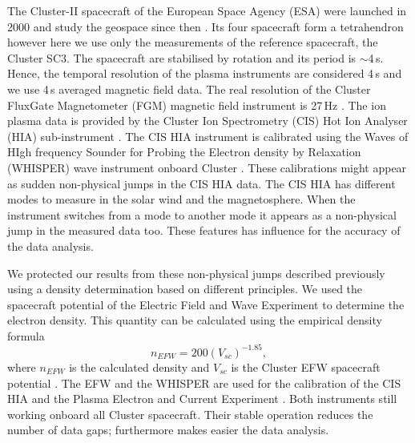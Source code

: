 \documentclass[linenumbers,draft]{agujournal}
\begin{document}
The Cluster-II spacecraft of the European Space Agency (ESA) were launched in 2000 and study the geospace since then \citep{credland97:_clust_mission,escoubet01:_introd_clust}. Its four spacecraft form a tetrahendron however here we use only the measurements of the reference spacecraft, the Cluster SC3. The spacecraft are stabilised by rotation and its period is $\sim$4\,s. Hence, the temporal resolution of the plasma instruments are considered 4\,s and we use 4\,s averaged magnetic field data. The real resolution of the Cluster FluxGate Magnetometer (FGM) magnetic field instrument is 27\,Hz \citep{balogh97:_clust_magnet_field_inves,balogh01:_clust_magnet_field_inves}. The ion plasma data is provided by the Cluster Ion Spectrometry (CIS) Hot Ion Analyser (HIA) sub-instrument \citep{reme97:_clust_ion_spect_exper,reme01:_first_earth_clust_cis}. The CIS HIA instrument is calibrated using the Waves of HIgh frequency Sounder for Probing the Electron density by Relaxation (WHISPER) wave instrument onboard Cluster \citep{decreau01:_early_whisp_clust,trotignon10:_whisp_relax_sound_clust_activ_archiv,blagau13:_in_hot_ion_analy_clust,blagau14:_in_hot_ion_analy_clust}. These calibrations might appear as sudden non-physical jumps in the CIS HIA data. The CIS HIA has different modes to measure in the solar wind and the magnetosphere. When the instrument switches from a mode to another mode it appears as a non-physical jump in the measured data too. These features has influence for the accuracy of the data analysis.

We protected our results from these non-physical jumps described previously using a density determination based on different principles. We used the spacecraft potential of the Electric Field and Wave Experiment \citep[EFW ;][]{gustafsson97:_elect_field_wave_exper_clust_mission,gustafsson01:_first_clust_efw} to determine the electron density. This quantity can be calculated using the empirical density formula 
\begin{equation}\label{eq:empdens}
n_{EFW}=200(V_{sc})^{-1.85},
\end{equation}
where $n_{EFW}$ is the calculated density and $V_{sc}$ is the Cluster EFW spacecraft potential \citep{trotignon10:_whisp_relax_sound_clust_activ_archiv,trotignon11:_calib_repor_whisp_measur_clust}. The EFW and the WHISPER are used for the calibration of the CIS HIA and the Plasma Electron and Current Experiment \citep[PEACE;][]{johnstone97:_peace,fazakerley10:_peace_data_clust_activ_archiv,fazakerley10:_clust_peace_in_calib_status}. Both instruments still working onboard all Cluster spacecraft. Their stable operation reduces the number of data gaps; furthermore makes easier the data analysis.
\end{document}
